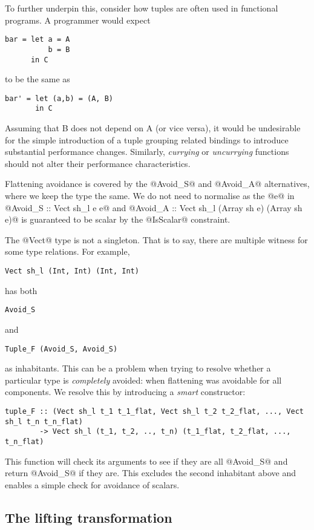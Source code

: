 To further underpin this, consider how tuples are often used in functional programs. A programmer would expect
%
\begin{lstlisting}[style=ndp]
bar = let a = A
          b = B
      in C
\end{lstlisting}
%
to be the same as
%
\begin{lstlisting}[style=ndp]
bar' = let (a,b) = (A, B)
       in C
\end{lstlisting}
%
Assuming that B does not depend on A (or vice versa), it would be undesirable for the simple introduction of a tuple grouping related bindings to introduce substantial performance changes. Similarly, \emph{currying} or \emph{uncurrying} functions should not alter their performance characteristics.

Flattening avoidance is covered by the @Avoid_S@ and @Avoid_A@ alternatives, where we keep the type the same. We do not need to normalise as the @e@ in @Avoid_S :: Vect sh_l e e@ and @Avoid_A :: Vect sh_l (Array sh e) (Array sh e)@ is guaranteed to be scalar by the @IsScalar@ constraint.

The @Vect@ type is not a singleton. That is to say, there are multiple witness for some type relations. For example,
%
\begin{lstlisting}[style=ndp]
Vect sh_l (Int, Int) (Int, Int)
\end{lstlisting}
%
has both
%
\begin{lstlisting}[style=ndp]
Avoid_S
\end{lstlisting}
%
and
%
\begin{lstlisting}[style=ndp]
Tuple_F (Avoid_S, Avoid_S)
\end{lstlisting}
%
as inhabitants. This can be a problem when trying to resolve whether a particular type is \emph{completely} avoided: when flattening was avoidable for all components. We resolve this by introducing a \emph{smart} constructor:
%
\begin{lstlisting}[style=ndp]
tuple_F :: (Vect sh_l t_1 t_1_flat, Vect sh_l t_2 t_2_flat, ..., Vect sh_l t_n t_n_flat)
        -> Vect sh_l (t_1, t_2, .., t_n) (t_1_flat, t_2_flat, ..., t_n_flat)
\end{lstlisting}

This function will check its arguments to see if they are all @Avoid_S@ and return @Avoid_S@ if they are. This excludes the second inhabitant above and enables a simple check for avoidance of scalars.

\subsection{The lifting transformation}

